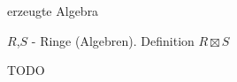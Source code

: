 \documentclass[class=article, crop=false]{standalone}
\begin{document}
\begin{zettel}{erzeugte Algebra}
\begin{flashcard}[p0wgneb0]{$R$,$S$ - Ringe (Algebren). Definition $R \boxtimes S$  }

	\begin{definition}[$R \boxtimes S$ ]
		TODO
	\end{definition}
\end{flashcard}

\end{zettel}
\end{document}
